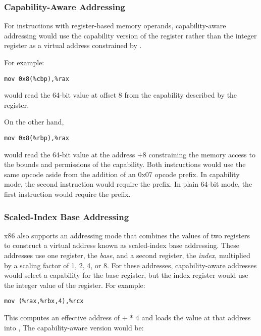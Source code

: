 \subsubsection{Capability-Aware Addressing}

For instructions with register-based memory operands, capability-aware
addressing would use the capability version of the register rather
than the integer register as a virtual address constrained by \DDC{}.

For example:

\begin{verbatim}
mov 0x8(%cbp),%rax
\end{verbatim}

would read the 64-bit value at offset 8 from the capability described
by the \CBP{} register.

On the other hand,

\begin{verbatim}
mov 0x8(%rbp),%rax
\end{verbatim}

would read the 64-bit value at the address \RBP{}+8 constraining the
memory access to the bounds and permissions of the \DDC{} capability.
Both instructions would use the same opcode aside from the addition of
an 0x07 opcode prefix.  In capability mode, the second
instruction would require the prefix.  In plain 64-bit mode,
the first instruction would require the prefix.

\subsubsection{Scaled-Index Base Addressing}

x86 also supports an addressing mode that combines the values of two
registers to construct a virtual address known as scaled-index base
addressing.  These addresses use one register, the \emph{base}, and a
second register, the \emph{index}, multiplied by a scaling factor of 1, 2,
4, or 8.  For these addresses, capability-aware addresses would select
a capability for the base register, but the index register would use
the integer value of the register.  For example:

\begin{verbatim}
mov (%rax,%rbx,4),%rcx
\end{verbatim}

This computes an effective address of \RAX{} + \RBX{} * 4 and loads the value
at that address into \RCX{},  The capability-aware version would be:

